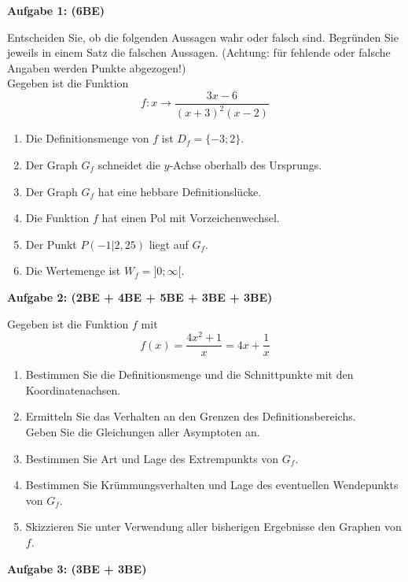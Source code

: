 \documentclass[a4paper,12pt]{article}
\newcommand{\Aufgabe}[1]{
  {
  \vspace*{0.5cm}
  \textsf{\textbf{Aufgabe #1}}
  \vspace*{0.2cm}
  
  }
}
\begin{document}
\vspace{5cm}

\newpage


\Aufgabe{1: (6BE)}
Entscheiden Sie, ob die folgenden Aussagen wahr oder falsch sind. Begründen Sie jeweils in einem Satz die falschen Aussagen. (Achtung: für fehlende oder falsche Angaben werden Punkte abgezogen!)\\

Gegeben ist die Funktion 
\[f: x \rightarrow \frac{3x-6}{(x+3)^2(x-2)}\]

\begin{enumerate}[label={\alph*)}]
  \item Die Definitionsmenge von $f$ ist $D_f = \{-3; 2\}$.
  \item Der Graph $G_f$ schneidet die $y$-Achse oberhalb des Ursprungs.
  \item Der Graph $G_f$ hat eine hebbare Definitionslücke.
  \item Die Funktion $f$ hat einen Pol mit Vorzeichenwechsel.
  \item Der Punkt $P(-1|2,25)$ liegt auf $G_f$.
  \item Die Wertemenge ist $W_f = ]0; \infty[$.
\end{enumerate}

\vspace{2cm}
\Aufgabe{2: (2BE + 4BE + 5BE + 3BE + 3BE)}
Gegeben ist die Funktion $f$ mit
\[ f(x) = \frac{4x^2+1}{x} = 4x + \frac{1}{x} \]
\begin{enumerate}[label={\alph*)}]
  \item Bestimmen Sie die Definitionsmenge und die Schnittpunkte mit den Koordinatenachsen.
  \item Ermitteln Sie das Verhalten an den Grenzen des Definitionsbereichs.\\
    Geben Sie die Gleichungen aller Asymptoten an.
  \item Bestimmen Sie Art und Lage des Extrempunkts von $G_f$.
  \item Bestimmen Sie Krümmungsverhalten und Lage des eventuellen Wendepunkts von $G_f$.
  \item Skizzieren Sie unter Verwendung aller bisherigen Ergebnisse den Graphen von $f$.
\end{enumerate}

\newpage
\Aufgabe{3: (3BE + 3BE)}

\addtolength{\topmargin}{-6.0pt}
\setlength{\headheight}{18.0pt}
\end{document}
